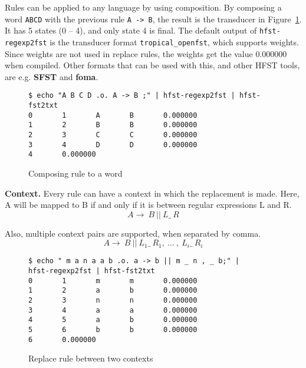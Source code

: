 \documentclass{llncs}
\begin{document}
Rules can be applied to any language by using composition. 
By composing a word \verb!ABCD! with the previous rule \verb!A -> B!, 
the result is the transducer in Figure~\ref{fig:replace_compose}. 
It has 5 states (0 -- 4), and only state 4 is final. The default output of \verb!hfst-regexp2fst! is 
the transducer format \verb!tropical_openfst!, which supports weights. 
Since weights are not used in replace rules, the weights get the value 0.000000 when compiled. 
Other formats that can be used with this, and other HFST tools, are e.g. \textbf{SFST} and \textbf{foma}.

\begin{figure} [h!]
{\footnotesize
\begin{verbatim}
$ echo "A B C D .o. A -> B ;" | hfst-regexp2fst | hfst-fst2txt
0       1       A       B       0.000000
1       2       B       B       0.000000
2       3       C       C       0.000000
3       4       D       D       0.000000
4       0.000000
\end{verbatim}
}
\caption{Composing rule to a word}
\label{fig:replace_compose}
\end{figure}





\textbf{Context.} Every rule can have a context in which the replacement is made. 
Here, A will be mapped to B if and only if it is between regular expressions
L and R.
\begin{equation}
  A \rightarrow\ B\ ||\ L \_\  R
\end{equation}

Also, multiple context pairs are supported, when separated by comma.
\begin{equation}
  A \rightarrow\ B\ ||\ L_1 \_\  R_1 ,\ \ldots\ ,\ L_i \_\  R_i
\end{equation}

\begin{figure} [h!]
{\footnotesize
\begin{verbatim}
$ echo " m a n a a b .o. a -> b || m _ n , _ b;" |
hfst-regexp2fst | hfst-fst2txt
0       1       m       m       0.000000
1       2       a       b       0.000000
2       3       n       n       0.000000
3       4       a       a       0.000000
4       5       a       b       0.000000
5       6       b       b       0.000000
6       0.000000
\end{verbatim}
}
\caption{Replace rule between two contexts}
\label{fig:multiple_contexts}
\end{figure}
\end{document}
